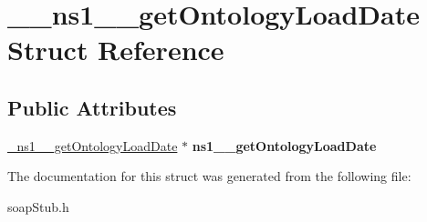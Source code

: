 \hypertarget{struct____ns1____getOntologyLoadDate}{
\section{\_\-\_\-ns1\_\-\_\-getOntologyLoadDate Struct Reference}
\label{struct____ns1____getOntologyLoadDate}
}
\subsection*{Public Attributes}
\begin{DoxyCompactItemize}
\item 
\hypertarget{struct____ns1____getOntologyLoadDate_a9e5b1d3425651f01a86d8d433256b294}{
\hyperlink{class__ns1____getOntologyLoadDate}{\_\-ns1\_\-\_\-getOntologyLoadDate} $\ast$ {\bfseries ns1\_\-\_\-getOntologyLoadDate}}
\label{struct____ns1____getOntologyLoadDate_a9e5b1d3425651f01a86d8d433256b294}

\end{DoxyCompactItemize}


The documentation for this struct was generated from the following file:\begin{DoxyCompactItemize}
\item 
soapStub.h\end{DoxyCompactItemize}
